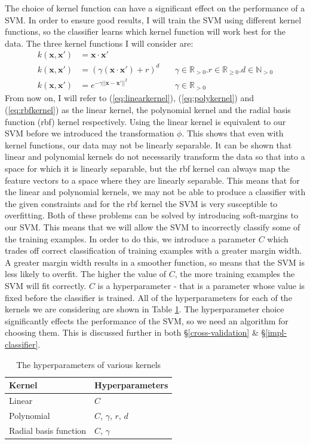 \documentclass[12pt,a4paper,twoside,openright]{report}
\begin{document}
The choice of kernel function can have a significant effect on the performance of a SVM. In order to ensure good results, I will train the SVM using different kernel functions, so the classifier learns which kernel function will work best for the data. The three kernel functions I will consider are:
\begin{align}
	k(\mathbf{x}, \mathbf{x}') & = \mathbf{x} \cdot \mathbf{x}'& \label{eq:linearkernel} \\
	k(\mathbf{x}, \mathbf{x}') & = (\gamma (\mathbf{x} \cdot \mathbf{x}') + r)^d \quad & \gamma \in \mathbb{R}_{> 0} . r \in \mathbb{R}_{\ge 0} . d \in \mathbb{N}_{> 0} \label{eq:polykernel} \\
	k(\mathbf{x}, \mathbf{x}') & = e^{-\gamma ||\mathbf{x} - \mathbf{x}'||^2} \quad & \gamma \in \mathbb{R}_{> 0} \label{eq:rbfkernel}
\end{align}
From now on, I will refer to (\ref{eq:linearkernel}), (\ref{eq:polykernel}) and (\ref{eq:rbfkernel}) as the linear kernel, the polynomial kernel and the radial basis function (rbf) kernel respectively. Using the linear kernel is equivalent to our SVM before we introduced the transformation $\phi$. This shows that even with kernel functions, our data may not be linearly separable. It can be shown that linear and polynomial kernels do not necessarily transform the data so that into a space for which it is linearly separable, but the rbf kernel can always map the feature vectors to a space where they are linearly separable. This means that for the linear and polynomial kernels, we may not be able to produce a classifier with the given constraints and for the rbf kernel the SVM is very susceptible to overfitting. Both of these problems can be solved by introducing soft-margins to our SVM. This means that we will allow the SVM to incorrectly classify some of the training examples. In order to do this, we introduce a parameter $C$ which trades off correct classification of training examples with a greater margin width. A greater margin width results in a smoother function, so means that the SVM is less likely to overfit. The higher the value of $C$, the more training examples the SVM will fit correctly. $C$ is a hyperparameter - that is a parameter whose value is fixed before the classifier is trained. All of the hyperparameters for each of the kernels we are considering are shown in Table \ref{table:hyperparameters}. The hyperparameter choice significantly effects the performance of the SVM, so we need an algorithm for choosing them. This is discussed further in both \S\ref{cross-validation} \& \S\ref{impl-classifier}.
\FloatBarrier
\begin{table}[]
	\centering
	\label{table:hyperparameters}
	\begin{tabular}{ll}
		\textbf{Kernel}       & \textbf{Hyperparameters} \\ \hline
		Linear                & $C$                      \\
		Polynomial            & $C$, $\gamma$, $r$, $d$  \\
		Radial basis function & $C$, $\gamma$             
	\end{tabular}
	\caption{The hyperparameters of various kernels}
\end{table}
\FloatBarrier
\end{document}
